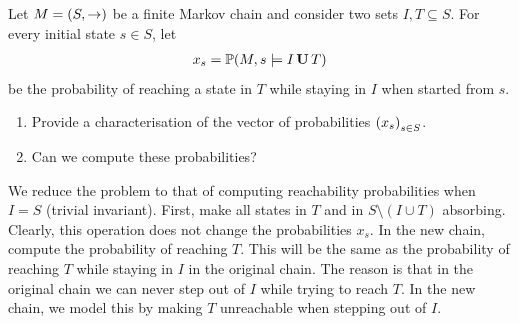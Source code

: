 \begin{exercise}
    Let $M = \left( S, \to \right)$ be a finite Markov chain
    and consider two sets $I, T \subseteq S$.
    For every initial state $s \in S$, let
    \begin{align*}
        x_s = \mathbb P(M, s \models I \,\mathbf U\, T)
    \end{align*}
    be the probability of reaching a state in $T$ while staying in $I$ when started from $s$.
    \begin{enumerate}
        \item Provide a characterisation of the vector of probabilities $\left( x_s \right)_{s \in S}$.
    
        \item Can we compute these probabilities?
    \end{enumerate}
\end{exercise}
\begin{solution}
    We reduce the problem to that of computing reachability probabilities when $I = S$ (trivial invariant).
    First, make all states in $T$ and in $S \setminus (I \cup T)$ absorbing.
    Clearly, this operation does not change the probabilities $x_s$.
    In the new chain, compute the probability of reaching $T$.
    This will be the same as the probability of reaching $T$ while staying in $I$ in the original chain.
    The reason is that in the original chain we can never step out of $I$ while trying to reach $T$.
    In the new chain, we model this by making $T$ unreachable when stepping out of $I$.
\end{solution}

